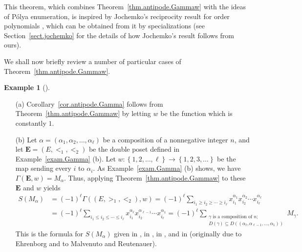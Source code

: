 \documentclass[numbers=enddot,12pt,final,onecolumn,notitlepage,abstracton]{scrartcl}%
\theoremstyle{definition}
\newtheorem{exam}[theo]{Example}
\newenvironment{example}[1][]
{\begin{exam}[#1]\begin{leftbar}}
{\end{leftbar}\end{exam}}
\let\sumnonlimits\sum
\renewcommand{\sum}{\sumnonlimits\limits}
\newcommand{\EE}{{\mathbf{E}}}
\begin{document}
This theorem, which combines Theorem~\ref{thm.antipode.Gammaw} with the
ideas of P\'olya enumeration, is inspired by Jochemko's reciprocity
result for order polynomials \cite[Theorem 2.8]{Joch}, which can be
obtained from it by specializations (see Section~\ref{sect.jochemko}
for the details of how Jochemko's result follows from ours).

We shall now briefly review a number of particular cases of
Theorem~\ref{thm.antipode.Gammaw}.

\begin{example}
\label{exam.antipode.Gammaw}

\begin{enumerate}

\item[(a)] Corollary~\ref{cor.antipode.Gamma}
follows from Theorem~\ref{thm.antipode.Gammaw} by letting $w$
be the function which is constantly $1$.

\item[(b)] Let
$\alpha = \left(\alpha_1, \alpha_2, \ldots, \alpha_\ell\right)$
be a composition of a nonnegative integer $n$, and let
$\EE = \left(E, <_1, <_2\right)$ be the double poset defined
in Example~\ref{exam.Gamma} (b). Let
$w : \left\{1, 2, \ldots, \ell\right\} \to \left\{ 1, 2, 3,
\ldots \right\}$ be the map sending every $i$ to $\alpha_i$.
As Example~\ref{exam.Gamma} (b) shows, we have
$\Gamma\left(\EE, w\right) = M_\alpha$.
Thus, applying Theorem~\ref{thm.antipode.Gammaw} to these $\EE$
and $w$ yields
\begin{align*}
S\left(M_\alpha\right)
&= \left(-1\right)^\ell
   \Gamma\left(\left(E, >_1, <_2\right), w\right)
= \left(-1\right)^\ell
  \sum_{i_1 \geq i_2 \geq \cdots \geq i_\ell}
  x_{i_1}^{\alpha_1} x_{i_2}^{\alpha_2} \cdots
      x_{i_\ell}^{\alpha_\ell} \\
&= \left(-1\right)^\ell
  \sum_{i_1 \leq i_2 \leq \cdots \leq i_\ell}
  x_{i_1}^{\alpha_\ell} x_{i_2}^{\alpha_{\ell-1}} \cdots
      x_{i_\ell}^{\alpha_1}
= \left(-1\right)^\ell
  \sum_{\substack{\gamma \text{ is a composition of } n ; \\
        D\left(\gamma\right) \subseteq
        D\left(\left(\alpha_\ell, \alpha_{\ell-1},
                     \ldots, \alpha_1\right)\right)}}
  M_\gamma .
\end{align*}
This is the formula for $S\left(M_\alpha\right)$
given in \cite[Proposition 3.4]{Ehrenb96},
in \cite[(4.26)]{Malve-Thesis}, in
\cite[Theorem 5.11]{Reiner}, and in
\cite[Theorem 4.1]{BenSag} (originally due to Ehrenborg
and to Malvenuto and Reutenauer).


\end{enumerate}
\end{example}
\end{document}

